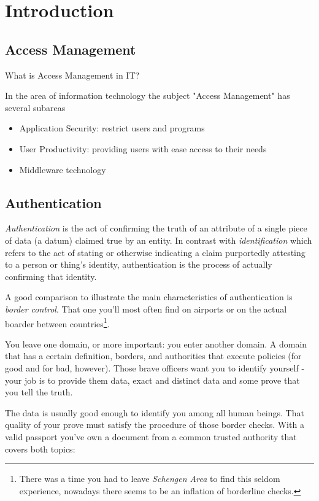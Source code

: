
\chapter[Introduction]{Introduction}

\section{Access Management}

What is Access Management in IT? 

In the area of information technology the subject "Access Management" has several subareas

\begin{itemize}
    \item Application Security: restrict users and programs
    \item User Productivity: providing users with ease access to their needs
    \item Middleware technology
\end{itemize}


\section{Authentication}

\emph{Authentication} is the act of confirming the truth of an attribute of a single piece of data (a datum) claimed true by an entity. In contrast with \emph{identification} which refers to the act of stating or otherwise indicating a claim purportedly attesting to a person or thing's identity, authentication is the process of actually confirming that identity.

A good comparison to illustrate the main characteristics of authentication is \emph{border control}. That one you'll most often find on airports or on the actual boarder between countries\footnote{There was a time you had to leave \emph{Schengen Area} to find this seldom experience, nowadays there seems to be an inflation of borderline checks.}.

You leave one domain, or more important: you enter another domain. A domain that has a certain definition, borders, and authorities that execute policies (for good and for bad, however).  Those brave officers want you to identify yourself - your job is to provide them data, exact and distinct data and some prove that you tell the truth.

The data is usually good enough to identify you among all human beings. That quality of your prove must satisfy the procedure of those border checks. With a valid passport you've own a document from a common trusted authority that covers both topics:

